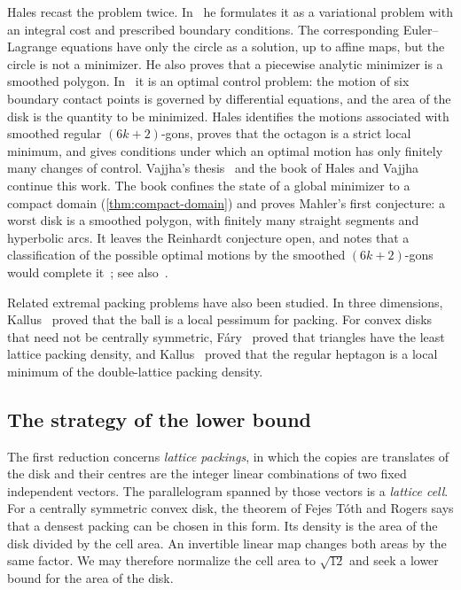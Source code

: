 Hales recast the problem twice. In~\cite{Hales2011} he formulates it as a variational problem
with an integral cost and prescribed boundary conditions. The corresponding Euler--Lagrange
equations have only the circle as a solution, up to affine maps, but the circle is not a
minimizer. He also proves that a piecewise analytic minimizer is a smoothed polygon.
In~\cite{Hales2017} it is an optimal control problem: the motion of six boundary contact points
is governed by differential equations, and the area of the disk is the quantity to be minimized.
Hales identifies the motions associated with smoothed regular $(6k+2)$-gons, proves that the
octagon is a strict local minimum, and gives conditions under which an optimal motion has only
finitely many changes of control. Vajjha's thesis~\cite{Vajjha2022} and the book of Hales and
Vajjha~\cite{HalesVajjha2024} continue this work. The book confines the state of a global
minimizer to a compact domain (\cref{thm:compact-domain}) and proves Mahler's first conjecture:
a worst disk is a smoothed polygon, with finitely many straight segments and hyperbolic arcs.
It leaves the Reinhardt conjecture open, and notes that a classification of the possible optimal
motions by the smoothed $(6k+2)$-gons would complete it~\cite[\S1.3]{HalesVajjha2024}; see
also~\cite{Barber2024}.

Related extremal packing problems have also been studied. In three dimensions,
Kallus~\cite{Kallus2014} proved that the ball is a local pessimum for packing. For convex disks
that need not be centrally symmetric, F\'ary~\cite{Fary1950} proved that triangles have the least
lattice packing density, and Kallus~\cite{Kallus2015} proved that the regular heptagon is a local
minimum of the double-lattice packing density.

\subsection{The strategy of the lower bound}\label{sec:strategy}

The first reduction concerns \emph{lattice packings}, in which the copies are translates of the
disk and their centres are the integer linear combinations of two fixed independent vectors. The
parallelogram spanned by those vectors is a \emph{lattice cell}. For a centrally symmetric convex
disk, the theorem of Fejes T\'oth and Rogers says that a densest packing can be chosen in this
form. Its density is the area of the disk divided by the cell area. An invertible linear map
changes both areas by the same factor. We may therefore normalize the cell area to $\sqrt{12}$ and
seek a lower bound for the area of the disk.

